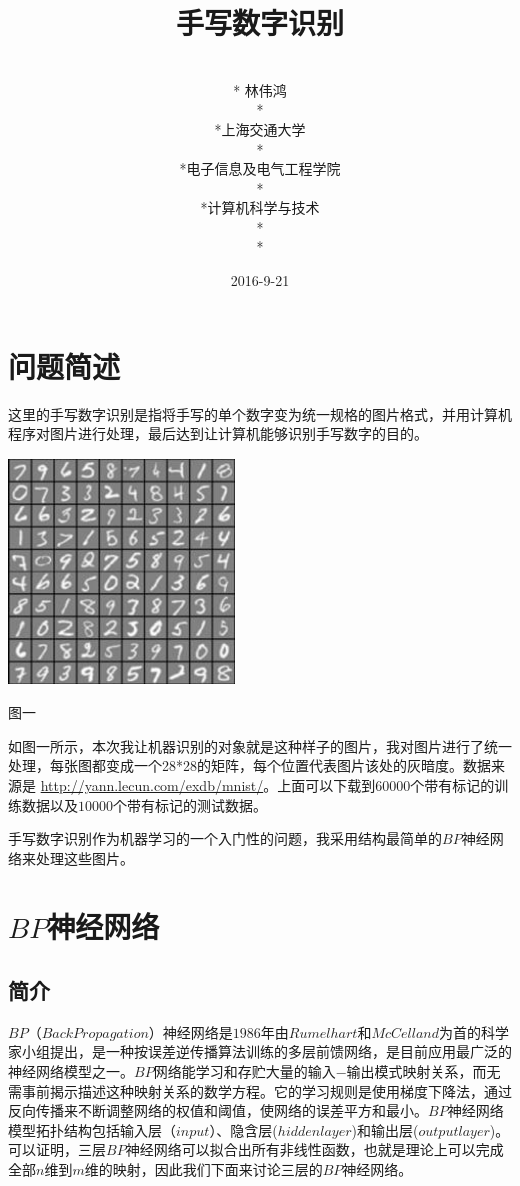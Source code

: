 ﻿\documentclass[UTF8]{ctexart}
\title{手写数字识别}
\author{\\* 林伟鸿\\* \\*上海交通大学\\*\\*电子信息及电气工程学院\\*\\*计算机科学与技术\\*\\*}
\date{2016-9-21}
\begin{document}
\maketitle
\newpage
\tableofcontents

\newpage
\section{问题简述}
这里的手写数字识别是指将手写的单个数字变为统一规格的图片格式，并用计算机程序对图片进行处理，最后达到让计算机能够识别手写数字的目的。\\ \par
\centerline{\includegraphics[height=6cm,width=6cm]{p1.jpg}}
\begin{center} 图一 \end{center}\par
如图一所示，本次我让机器识别的对象就是这种样子的图片，我对图片进行了统一处理，每张图都变成一个28*28的矩阵，每个位置代表图片该处的灰暗度。数据来源是
\url{http://yann.lecun.com/exdb/mnist/}。上面可以下载到$60000$个带有标记的训练数据以及$10000$个带有标记的测试数据。\par
手写数字识别作为机器学习的一个入门性的问题，我采用结构最简单的$BP$神经网络来处理这些图片。

\newpage
\section{$BP$神经网络}
    \subsection{简介}
$BP$（$Back Propagation$）神经网络是$1986$年由$Rumelhart$和$McCelland$为首的科学家小组提出，是一种按误差逆传播算法训练的多层前馈网络，是目前应用最广泛的神经网络模型之一。$BP$网络能学习和存贮大量的输入$-$输出模式映射关系，而无需事前揭示描述这种映射关系的数学方程。它的学习规则是使用梯度下降法，通过反向传播来不断调整网络的权值和阈值，使网络的误差平方和最小。$BP$神经网络模型拓扑结构包括输入层（$input$）、隐含层($hidden layer$)和输出层($output layer$)。可以证明，三层$BP$神经网络可以拟合出所有非线性函数，也就是理论上可以完成全部$n$维到$m$维的映射，因此我们下面来讨论三层的$BP$神经网络。
\end{document}
